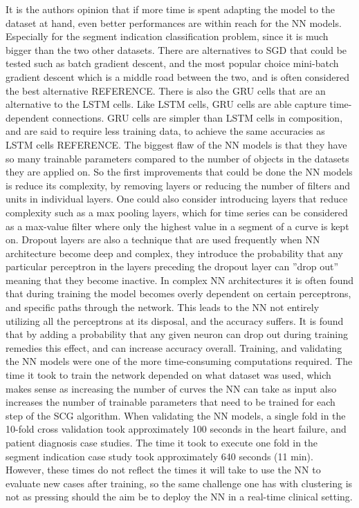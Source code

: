 It is the authors opinion that if more time is spent adapting the model to the dataset at hand, even better performances are within reach for the NN models. Especially for the segment indication classification problem, since it is much bigger than the two other datasets. There are alternatives to SGD that could be tested such as batch gradient descent, and the most popular choice mini-batch gradient descent which is a middle road between the two, and is often considered the best alternative REFERENCE. There is also the GRU cells that are an alternative to the LSTM cells. Like LSTM cells, GRU cells are able capture time-dependent connections. GRU cells are simpler than LSTM cells in composition, and are said to require less training data, to achieve the same accuracies as LSTM cells REFERENCE. The biggest flaw of the NN models is that they have so many trainable parameters compared to the number of objects in the datasets they are applied on. So the first improvements that could be done the NN models is reduce its complexity, by removing layers or reducing the number of filters and units in individual layers. One could also consider introducing layers that reduce complexity such as a max pooling layers, which for time series can be considered as a max-value filter where only the highest value in a segment of a curve is kept on. Dropout layers are also a technique that are used frequently when NN architecture become deep and complex, they introduce the probability that any particular perceptron in the layers preceding the dropout layer can ''drop out'' meaning that they become inactive. In complex NN architectures it is often found that during training the model becomes overly dependent on certain perceptrons, and specific paths through the network. This leads to the NN not entirely utilizing all the perceptrons at its disposal, and the accuracy suffers. It is found that by adding a probability that any given neuron can drop out during training remedies this effect, and can increase accuracy overall.
Training, and validating the NN models were one of the more time-consuming computations required. The time it took to train the network depended on what dataset was used, which makes sense as increasing the number of curves the NN can take as input also increases the number of trainable parameters that need to be trained for each step of the SCG algorithm. When validating the NN models, a single fold in the 10-fold cross validation took approximately 100 seconds in the heart failure, and patient diagnosis case studies. The time it took to execute one fold in the segment indication case study took approximately 640 seconds (11 min). However, these times do not reflect the times it will take to use the NN to evaluate new cases after training, so the same challenge one has with clustering is not as pressing should the aim be to deploy the NN in a real-time clinical setting.


